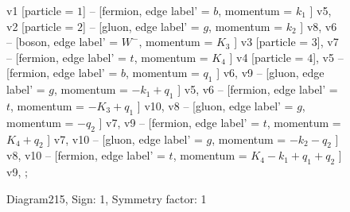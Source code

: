 \documentclass{revtex4}
\begin{document}
\begin{figure}[!htb]
\begin{center}
{    %
v1 [particle = \(1\)] -- [fermion, edge label' = \(b\), momentum = \(k_{1}\) ] v5, 
v2 [particle = \(2\)] -- [gluon, edge label' = \(g\), momentum = \(k_{2}\) ] v8, 
v6 -- [boson, edge label' = \(W^{-}\), momentum = \(K_{3}\) ] v3 [particle = \(3\)], 
v7 -- [fermion, edge label' = \(t\), momentum = \(K_{4}\) ] v4 [particle = \(4\)], 
v5 -- [fermion, edge label' = \(b\), momentum = \(q_{1}\) ] v6, 
v9 -- [gluon, edge label' = \(g\), momentum = \(-k_{1} + q_{1}\) ] v5, 
v6 -- [fermion, edge label' = \(t\), momentum = \(-K_{3} + q_{1}\) ] v10, 
v8 -- [gluon, edge label' = \(g\), momentum = \(-q_{2}\) ] v7, 
v9 -- [fermion, edge label' = \(t\), momentum = \(K_{4} + q_{2}\) ] v7, 
v10 -- [gluon, edge label' = \(g\), momentum = \(-k_{2} - q_{2}\) ] v8, 
v10 -- [fermion, edge label' = \(t\), momentum = \(K_{4} - k_{1} + q_{1} + q_{2}\) ] v9, 
};
\end{center}
\caption{Diagram215, Sign: 1, Symmetry factor: 1}
\end{figure}
\newpage
\end{document}
